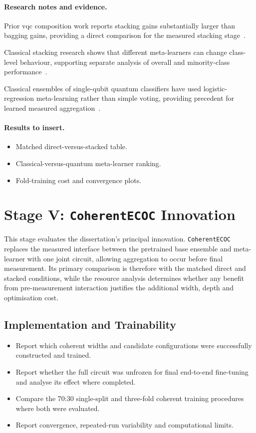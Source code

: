 \documentclass[]{UCD_CS_MSc_AAI_Report}
\newcommand{\method}[1]{{\color{cyan!80!black}#1}}
\newcommand{\result}[1]{{\color{green!60!black}#1}}
\newcommand{\comparison}[1]{{\color{pink!70!violet}#1}}
\newcommand{\researchnotes}{\paragraph{Research notes and evidence.}}
\newcommand{\resultplaceholder}{\paragraph{Results to insert.}}
\begin{document}
\researchnotes
\begin{itemize}
    \result{\item Prior \ac{vqc} composition work reports stacking gains substantially larger than bagging gains, providing a direct comparison for the measured stacking stage~\cite{pinto_composing_2026}.}
    \comparison{\item Classical stacking research shows that different meta-learners can change class-level behaviour, supporting separate analysis of overall and minority-class performance~\cite{demir_modified_2018}.}
    \method{\item Classical ensembles of single-qubit quantum classifiers have used logistic-regression meta-learning rather than simple voting, providing precedent for learned measured aggregation~\cite{mcfarthing_classical_2024}.}
\end{itemize}

\resultplaceholder
\begin{itemize}
    \item Matched direct-versus-stacked table.
    \item Classical-versus-quantum meta-learner ranking.
    \item Fold-training cost and convergence plots.
\end{itemize}

\section{Stage V: \texttt{CoherentECOC} Innovation}
\label{sec:results-coherent}

This stage evaluates the dissertation's principal innovation. \texttt{CoherentECOC} replaces the measured interface between the pretrained base ensemble and meta-learner with one joint circuit, allowing aggregation to occur before final measurement. Its primary comparison is therefore with the matched direct and stacked conditions, while the resource analysis determines whether any benefit from pre-measurement interaction justifies the additional width, depth and optimisation cost.

\subsection{Implementation and Trainability}
\begin{itemize}
    \item Report which coherent widths and candidate configurations were successfully constructed and trained.
    \item Report whether the full circuit was unfrozen for final end-to-end fine-tuning and analyse its effect where completed.
    \item Compare the 70:30 single-split and three-fold coherent training procedures where both were evaluated.
    \item Report convergence, repeated-run variability and computational limits.
\end{itemize}
\end{document}
